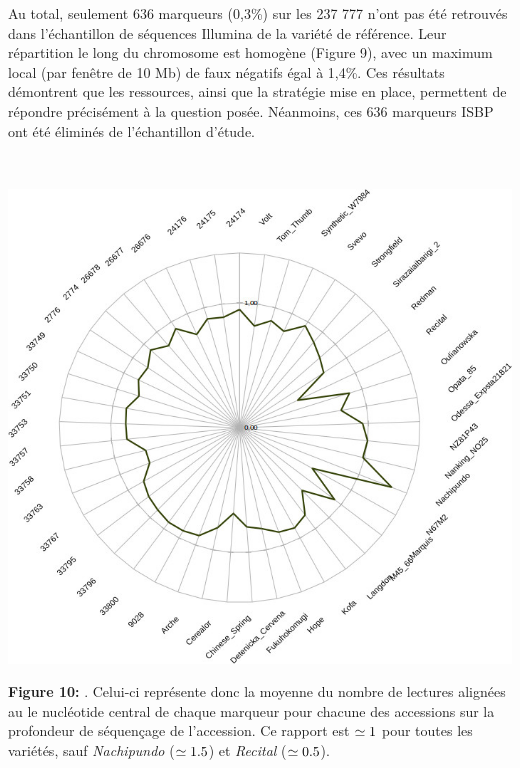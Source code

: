 \documentclass[a4paper, 12pt]{article}
\begin{document}
\begin{onehalfspace}
Au total, seulement 636 marqueurs (0,3\%) sur les 237 777 n'ont pas été retrouvés dans l'échantillon de séquences Illumina de la variété de référence. Leur répartition le long du chromosome est homogène (Figure 9), avec un maximum local (par fenêtre de 10 Mb) de faux négatifs égal à 1,4\%. Ces résultats démontrent que les ressources, ainsi que la stratégie mise en place, permettent de répondre précisément à la question posée. Néanmoins, ces 636 marqueurs ISBP ont été éliminés de l'échantillon d'étude.

\newpage
\thispagestyle{empty}
~ \vfill
\begin{center}
\includegraphics[scale=0.55]{pic_Data/fig9.jpeg}
\end{center}
\textbf{Figure 10:} . Celui-ci représente donc la moyenne du nombre de lectures alignées au le nucléotide central de chaque marqueur pour chacune des accessions sur la profondeur de séquençage de l'accession. Ce rapport est $\begin{simeq}1\end{simeq}$ pour toutes les variétés, sauf \textit{Nachipundo} ($\begin{simeq}1.5\end{simeq}$) et \textit{Recital} ($\begin{simeq}0.5\end{simeq}$).
\vfill
\addtocounter{page}{-1}
\newpage


\end{onehalfspace}
\end{document}
